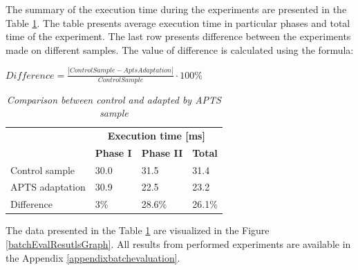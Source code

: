 \documentclass[10pt,a4paper]{article}
\begin{document}
The summary of the execution time during the experiments are presented in the Table \ref{batchCompResutls}. The table presents average execution time in particular phases and total time of the experiment. The last row presents difference between the experiments made on different samples. The value of difference is calculated using the formula: 

\begin{center}
$Difference = \frac{|ControlSample - AptsAdaptation|}{ControlSample}\cdot 100\%$
\end{center}


\begin{table}[!htb]
\caption{\textit{Comparison between control and adapted by APTS sample}} \label{batchCompResutls}
\begin{tabularx}{\textwidth}{p{4cm}|XXX|}

                 &  \multicolumn{3}{c|}{\textbf{Execution time [ms]}} \\
                 &  \textbf{Phase I } & \textbf{Phase II} & \textbf{Total} \\ \hline
Control sample   &  30.0 & 31.5 & 31.4 \\ 
APTS adaptation  &  30.9 & 22.5 & 23.2 \\ \hline
Difference       &  3\% & 28.6\% & 26.1\% \\ 
\end{tabularx}
\end{table}

The data presented in the Table \ref{batchCompResutls} are visualized in the Figure \ref{batchEvalResutlsGraph}.  All results from performed experiments are available in the Appendix \ref{appendixbatchevaluation}. 
\end{document}

